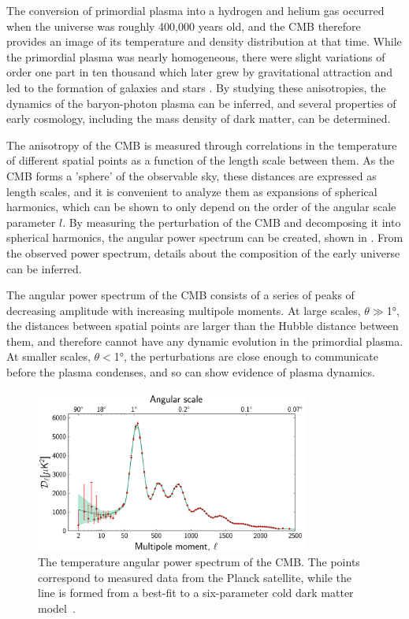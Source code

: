 The conversion of primordial plasma into a hydrogen and helium gas occurred when the universe was roughly 400,000 years old, and the CMB therefore provides an image of its temperature and density distribution at that time.
While the primordial plasma was nearly homogeneous, there were slight variations of order one part in ten thousand which later grew by gravitational attraction and led to the formation of galaxies and stars \cite{kurkisuonio}.
By studying these anisotropies, the dynamics of the baryon-photon plasma can be inferred, and several properties of early cosmology, including the mass density of dark matter, can be determined.

The anisotropy of the CMB is measured through correlations in the temperature of different spatial points as a function of the length scale between them. 
As the CMB forms a 'sphere' of the observable sky, these distances are expressed as length scales, and it is convenient to analyze them as expansions of spherical harmonics, which can be shown to only depend on the order of the angular scale parameter $l$. 
By measuring the perturbation of the CMB and decomposing it into spherical harmonics, the angular power spectrum can be created, shown in .
From the observed power spectrum, details about the composition of the early universe can be inferred.

The angular power spectrum of the CMB consists of a series of peaks of decreasing amplitude with increasing multipole moments. 
At large scales, $\theta \gg $\ang{1}, the distances between spatial points are larger than the Hubble distance between them, and therefore cannot have any dynamic evolution in the primordial plasma.
At smaller scales, $\theta < $\ang{1}, the perturbations are close enough to communicate before the plasma condenses, and so can show evidence of plasma dynamics.

\begin{figure}[htpb]
	\centering
	\includegraphics[width=0.8\textwidth]{figures/cmb_power_spectrum.png}
	\caption[The temperature angular power spectrum of the CMB]{The temperature angular power spectrum of the CMB. The points correspond to measured data from the Planck satellite, while the line is formed from a best-fit to a six-parameter cold dark matter model~\cite{PlanckCMB}.}
	\label{fig:CMBpowerSpectrum}
\end{figure}

